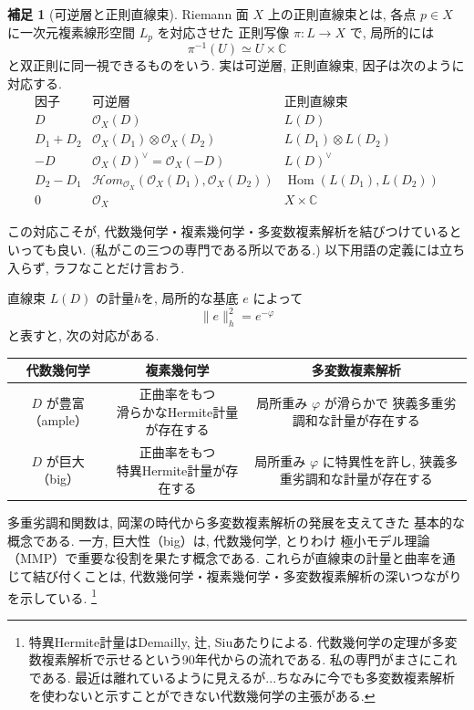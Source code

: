 \documentclass[dvipdfmx,a4paper,11pt]{article} %
\newcommand{\C}{\mathbb{C}}
\theoremstyle{definition}
\numberwithin{equation}{section}
\newtheorem{rem}[thm]{補足}
\begin{document}
\begin{rem}[可逆層と正則直線束]\label{rem-ample-big}
Riemann 面 $X$ 上の正則直線束とは, 
各点 $p\in X$ に一次元複素線形空間 $L_p$ を対応させた
正則写像 $\pi:L\to X$ で, 局所的には
\[
\pi^{-1}(U)\simeq U\times\C
\]
と双正則に同一視できるものをいう.
実は可逆層, 正則直線束, 因子は次のように対応する. 
\[
\begin{array}{c|c|c}
\text{因子} & \text{可逆層} & \text{正則直線束}\\ \hline
D & \mathcal O_X(D) & L(D)\\[2pt]
D_1+D_2
& \mathcal O_X(D_1)\otimes\mathcal O_X(D_2)
& L(D_1)\otimes L(D_2)\\[2pt]
-D
& \mathcal O_X(D)^\vee = \mathcal O_X(-D)
& L(D)^\vee\\[2pt]
D_2-D_1
& \mathcal Hom_{\mathcal O_X}
  (\mathcal O_X(D_1),\mathcal O_X(D_2))
& \operatorname{Hom}(L(D_1),L(D_2))\\[2pt]
0 & \mathcal O_X & X\times\C
\end{array}
\]

この対応こそが, 代数幾何学・複素幾何学・多変数複素解析を結びつけているといっても良い. 
(私がこの三つの専門である所以である.)
以下用語の定義には立ち入らず, ラフなことだけ言おう. 

直線束 $L(D)$ の計量$h$を, 局所的な基底 $e$ によって
\[
\|e\|_h^2=e^{-\varphi}
\]
と表すと, 次の対応がある. 
\begin{center}
\renewcommand{\arraystretch}{1.6}
\begin{tabular}{c|c|c}
代数幾何学 & 複素幾何学 & 多変数複素解析 \\ \hline
$D$ が豊富（ample）
&
\shortstack{正曲率をもつ\\滑らかなHermite計量が存在する}
&
\shortstack{局所重み $\varphi$ が滑らかで\\狭義多重劣調和な計量が存在する}
\\ \hline
$D$ が巨大（big）
&
\shortstack{正曲率をもつ\\特異Hermite計量が存在する}
&
\shortstack{局所重み $\varphi$ に特異性を許し, \\狭義多重劣調和な計量が存在する}
\end{tabular}
\end{center}

多重劣調和関数は, 岡潔の時代から多変数複素解析の発展を支えてきた
基本的な概念である.
一方, 巨大性（big）は, 代数幾何学, とりわけ
極小モデル理論（MMP）で重要な役割を果たす概念である.
これらが直線束の計量と曲率を通じて結び付くことは, 
代数幾何学・複素幾何学・多変数複素解析の深いつながりを示している.
\footnote{特異Hermite計量はDemailly, 辻, Siuあたりによる. 代数幾何学の定理が多変数複素解析で示せるという90年代からの流れである. 私の専門がまさにこれである. 最近は離れているように見えるが...ちなみに今でも多変数複素解析を使わないと示すことができない代数幾何学の主張がある. }

\end{rem}
\end{document}
